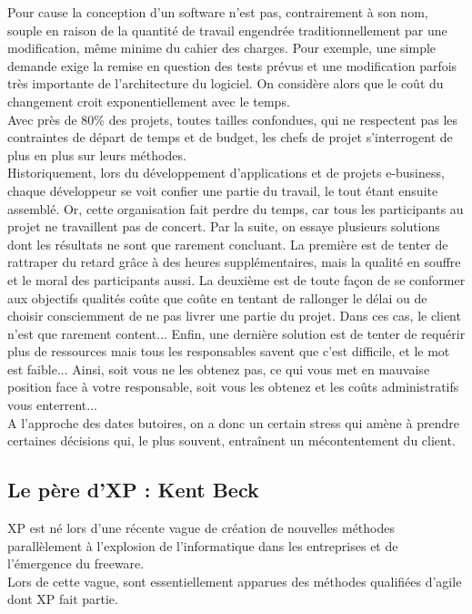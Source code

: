 \documentclass[]{article}
\begin{document}
Pour cause la conception d'un software n'est pas, contrairement à son
nom, souple en raison de la quantité de travail engendrée
traditionnellement par une modification, même minime du cahier des
charges. Pour exemple, une simple demande exige la remise en question
des tests prévus et une modification parfois très importante de
l'architecture du logiciel. On considère alors que le coût du changement
croit exponentiellement avec le temps.~\\
Avec près de 80\% des projets, toutes tailles confondues, qui ne
respectent pas les contraintes de départ de temps et de budget, les
chefs de projet s'interrogent de plus en plus sur leurs méthodes.~\\
Historiquement, lors du développement d'applications et de projets
e-business, chaque développeur se voit confier une partie du travail, le
tout étant ensuite assemblé. Or, cette organisation fait perdre du
temps, car tous les participants au projet ne travaillent pas de
concert. Par la suite, on essaye plusieurs solutions dont les résultats
ne sont que rarement concluant. La première est de tenter de rattraper
du retard grâce à des heures supplémentaires, mais la qualité en souffre
et le moral des participants aussi. La deuxième est de toute façon de se
conformer aux objectifs qualités coûte que coûte en tentant de rallonger
le délai ou de choisir consciemment de ne pas livrer une partie du
projet. Dans ces cas, le client n'est que rarement content... Enfin, une
dernière solution est de tenter de requérir plus de ressources mais tous
les responsables savent que c'est difficile, et le mot est faible...
Ainsi, soit vous ne les obtenez pas, ce qui vous met en mauvaise
position face à votre responsable, soit vous les obtenez et les coûts
administratifs vous enterrent...\\
A l'approche des dates butoires, on a donc un certain stress qui amène à
prendre certaines décisions qui, le plus souvent, entraînent un
mécontentement du client.~



\hypertarget{le-puxe8re-dxp-kent-beck}{%
\subsection{\texorpdfstring{\textbf{Le père d'XP : Kent
Beck}}{Le père d'XP : Kent Beck}}\label{le-puxe8re-dxp-kent-beck}}

XP est né lors d'une récente vague de création de nouvelles méthodes
parallèlement à l'explosion de l'informatique dans les entreprises et de
l'émergence du freeware.~\\
Lors de cette vague, sont essentiellement apparues des méthodes
qualifiées d'agile dont XP fait partie.
\end{document}
